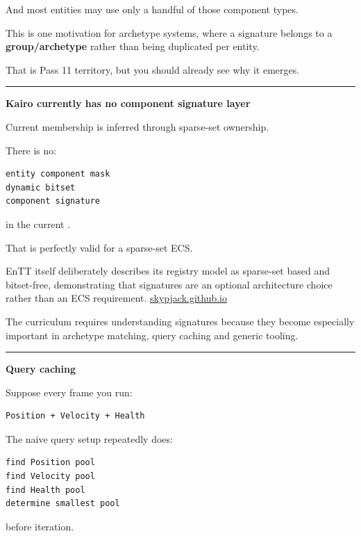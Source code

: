 And most entities may use only a handful of those component types.

This is one motivation for archetype systems, where a signature belongs to a \textbf{group/archetype} rather than being duplicated per entity.

That is Pass 11 territory, but you should already see why it emerges.

\begin{center}\rule{0.5\linewidth}{0.5pt}\end{center}

\textbf{Kairo currently has no component signature layer}

Current membership is inferred through sparse-set ownership.

There is no:

\begin{verbatim}
entity component mask
dynamic bitset
component signature
\end{verbatim}

in the current .

That is perfectly valid for a sparse-set ECS.

EnTT itself deliberately describes its registry model as sparse-set based and bitset-free, demonstrating that signatures are an optional architecture choice rather than an ECS requirement. \href{https://skypjack.github.io/entt/md_docs_2md_2entity.html?utm_source=chatgpt.com}{skypjack.github.io}

The curriculum requires understanding signatures because they become especially important in archetype matching, query caching and generic tooling.

\begin{center}\rule{0.5\linewidth}{0.5pt}\end{center}

\textbf{Query caching}

Suppose every frame you run:

\begin{verbatim}
Position + Velocity + Health
\end{verbatim}

The naive query setup repeatedly does:

\begin{verbatim}
find Position pool
find Velocity pool
find Health pool
determine smallest pool
\end{verbatim}

before iteration.

